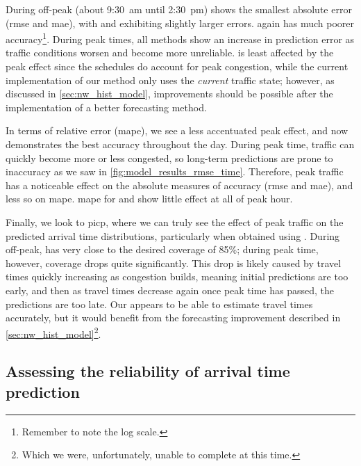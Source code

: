 During off-peak (about 9:30~am until 2:30~pm) \Fpf{} shows the smallest absolute error (\gls{rmse} and \gls{mae}), with \Fhist{} and \Fsched{} exhibiting slightly larger errors. \Fnorm{} again has much poorer accuracy\footnote{Remember to note the log scale.}. During peak times, all methods show an increase in prediction error as traffic conditions worsen and become more unreliable. \Fsched{} is least affected by the peak effect since the schedules do account for peak congestion, while the current implementation of our method only uses the \emph{current} traffic state; however, as discussed in \cref{sec:nw_hist_model}, improvements should be possible after the implementation of a better forecasting method.

In terms of relative error (\gls{mape}), we see a less accentuated peak effect, and now \Fpf{} demonstrates the best accuracy throughout the day. During peak time, traffic can quickly become more or less congested, so long-term predictions are prone to inaccuracy as we saw in \cref{fig:model_results_rmse_time}. Therefore, peak traffic has a noticeable effect on the absolute measures of accuracy (\gls{rmse} and \gls{mae}), and less so on \gls{mape}. \gls{mape} for \Fsched{} and \Fhist{} show little effect at all of peak hour.


Finally, we look to \gls{picp}, where we can truly see the effect of peak traffic on the predicted arrival time distributions, particularly when obtained using \Fpf{}. During off-peak, \Fpf{} has very close to the desired coverage of 85\%; during peak time, however, coverage drops quite significantly. This drop is likely caused by travel times quickly increasing as congestion builds, meaning initial predictions are too early, and then as travel times decrease again once peak time has passed, the predictions are too late. Our \pf{} appears to be able to estimate travel times accurately, but it would benefit from the forecasting improvement described in \cref{sec:nw_hist_model}\footnote{Which we were, unfortunately, unable to complete at this time.}.




\subsection{Assessing the reliability of arrival time prediction}
\label{sec:prediction_model_comp_probs}


